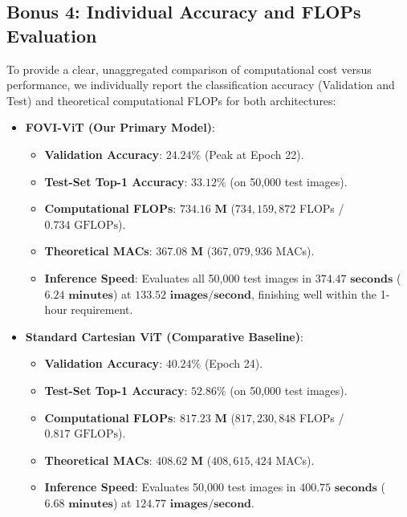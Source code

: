 \documentclass[10pt,conference]{IEEEtran}
\begin{document}
\subsection{Bonus 4: Individual Accuracy and FLOPs Evaluation}
To provide a clear, unaggregated comparison of computational cost versus performance, we individually report the classification accuracy (Validation and Test) and theoretical computational FLOPs for both architectures:

\begin{itemize}
    \item \textbf{FOVI-ViT (Our Primary Model)}:
    \begin{itemize}
        \item \textbf{Validation Accuracy}: $\mathbf{24.24\%}$ (Peak at Epoch 22).
        \item \textbf{Test-Set Top-1 Accuracy}: $\mathbf{33.12\%}$ (on 50,000 test images).
        \item \textbf{Computational FLOPs}: $\mathbf{734.16\text{ M}}$ ($734,159,872$ FLOPs / $0.734\text{ GFLOPs}$).
        \item \textbf{Theoretical MACs}: $\mathbf{367.08\text{ M}}$ ($367,079,936$ MACs).
        \item \textbf{Inference Speed}: Evaluates all 50,000 test images in $\mathbf{374.47\text{ seconds}}$ ($\mathbf{6.24\text{ minutes}}$) at $\mathbf{133.52\text{ images/second}}$, finishing well within the 1-hour requirement.
    \end{itemize}
    \item \textbf{Standard Cartesian ViT (Comparative Baseline)}:
    \begin{itemize}
        \item \textbf{Validation Accuracy}: $\mathbf{40.24\%}$ (Epoch 24).
        \item \textbf{Test-Set Top-1 Accuracy}: $\mathbf{52.86\%}$ (on 50,000 test images).
        \item \textbf{Computational FLOPs}: $\mathbf{817.23\text{ M}}$ ($817,230,848$ FLOPs / $0.817\text{ GFLOPs}$).
        \item \textbf{Theoretical MACs}: $\mathbf{408.62\text{ M}}$ ($408,615,424$ MACs).
        \item \textbf{Inference Speed}: Evaluates 50,000 test images in $\mathbf{400.75\text{ seconds}}$ ($\mathbf{6.68\text{ minutes}}$) at $\mathbf{124.77\text{ images/second}}$.
    \end{itemize}
\end{itemize}
\end{document}
